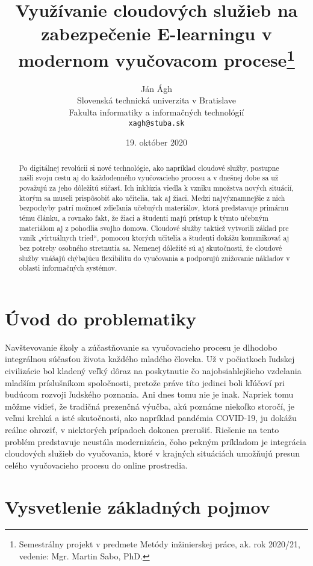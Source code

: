 \documentclass[10pt,slovak,a4paper]{article}%
\title{Využívanie cloudových služieb na zabezpečenie E-learningu v modernom vyučovacom procese\thanks{Semestrálny projekt v predmete Metódy inžinierskej práce, ak. rok 2020/21, vedenie: Mgr. Martin Sabo, PhD.}}
\author{Ján Ágh\\[2pt]
	{\small Slovenská technická univerzita v Bratislave}\\
	{\small Fakulta informatiky a informačných technológií}\\
	{\small \texttt{xagh@stuba.sk}}
	}
\date{\small 19. október 2020}
\begin{document}
\maketitle

\begin{abstract}

Po digitálnej revolúcii si nové technológie, ako napríklad cloudové služby, postupne
našli svoju cestu aj do každodenného vyučovacieho procesu a v dnešnej dobe sa už považujú
za jeho dôležitú súčasť. Ich inklúzia viedla k vzniku množstva nových situácií, ktorým sa
museli prispôsobiť ako učitelia, tak aj žiaci. Medzi najvýznamnejšie z nich bezpochyby patrí
možnosť zdieľania učebných materiálov, ktorá predstavuje primárnu tému článku, a rovnako
fakt, že žiaci a študenti majú prístup k týmto učebným materiálom aj z pohodlia svojho
domova. Cloudové služby taktiež vytvorili základ pre vznik „virtuálnych tried“, pomocou
ktorých učitelia a študenti dokážu komunikovať aj bez potreby osobného stretnutia sa.
Nemenej dôležité sú aj skutočnosti, že cloudové služby vnášajú chýbajúcu flexibilitu do
vyučovania a podporujú znižovanie nákladov v oblasti informačných systémov.
\end{abstract}



\section{Úvod do problematiky}

Navštevovanie školy a zúčastňovanie sa vyučovacieho procesu je dlhodobo integrálnou súčasťou života každého mladého človeka. Už v počiatkoch ľudskej civilizácie bol kladený veľký dôraz na poskytnutie čo najobsiahlejšieho vzdelania mladším príslušníkom spoločnosti, pretože práve títo jedinci boli kľúčoví pri budúcom rozvoji ľudského poznania. Ani dnes tomu nie je inak. Napriek tomu môžme vidieť, že tradičná prezenčná výučba, akú poznáme niekoľko storočí, je veľmi krehká a isté skutočnosti, ako napríklad pandémia COVID-19, ju dokážu reálne ohroziť, v niektorých prípadoch dokonca prerušiť. Riešenie na tento problém predstavuje neustála modernizácia, čoho pekným príkladom je integrácia cloudových služieb do vyučovania, ktoré v krajných situáciách umožňujú presun celého vyučovacieho procesu do online prostredia. 



\section{Vysvetlenie základných pojmov}
\end{document}
